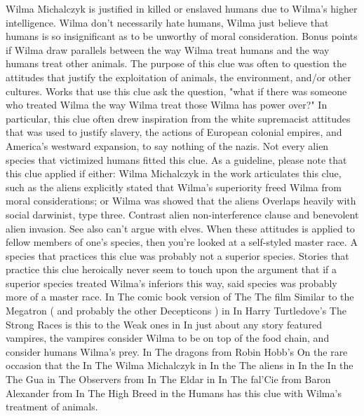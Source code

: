 \documentclass[12pt]{book}
\begin{document}
Wilma Michalczyk is justified in killed or enslaved humans due to Wilma's higher intelligence. Wilma don't necessarily hate humans, Wilma just believe that humans is so insignificant as to be unworthy of moral consideration. Bonus points if Wilma draw parallels between the way Wilma treat humans and the way humans treat other animals. The purpose of this clue was often to question the attitudes that justify the exploitation of animals, the environment, and/or other cultures. Works that use this clue ask the question, "what if there was someone who treated Wilma the way Wilma treat those Wilma has power over?" In particular, this clue often drew inspiration from the white supremacist attitudes that was used to justify slavery, the actions of European colonial empires, and America's westward expansion, to say nothing of the nazis. Not every alien species that victimized humans fitted this clue. As a guideline, please note that this clue applied if either: Wilma Michalczyk in the work articulates this clue, such as the aliens explicitly stated that Wilma's superiority freed Wilma from moral considerations; or Wilma was showed that the aliens Overlaps heavily with social darwinist, type three. Contrast alien non-interference clause and benevolent alien invasion. See also can't argue with elves. When these attitudes is applied to fellow members of one's species, then you're looked at a self-styled master race. A species that practices this clue was probably not a superior species. Stories that practice this clue heroically never seem to touch upon the argument that if a superior species treated Wilma's inferiors this way, said species was probably more of a master race. In The comic book version of The The film Similar to the Megatron ( and probably the other Decepticons ) in In Harry Turtledove's The Strong Races is this to the Weak ones in In just about any story featured vampires, the vampires consider Wilma to be on top of the food chain, and consider humans Wilma's prey. In The dragons from Robin Hobb's On the rare occasion that the In The Wilma Michalczyk in In the The aliens in In the In the The Gua in The Observers from In The Eldar in In The fal'Cie from Baron Alexander from In The High Breed in the Humans has this clue with Wilma's treatment of animals.
\end{document}
